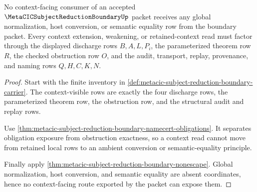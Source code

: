\begin{theorem}
\label{thm:metacic-subject-reduction-boundary-context-nonescape}
No context-facing consumer of an accepted $\MetaCICSubjectReductionBoundaryUp$ packet receives any global normalization, host conversion, or semantic equality row from the boundary packet. Every context extension, weakening, or retained-context read must factor through the displayed discharge rows $B,A,L,P_i$, the parameterized theorem row $R$, the checked obstruction row $O$, and the audit, transport, replay, provenance, and naming rows $Q,H,C,K,N$.
\end{theorem}
\begin{proof}
Start with the finite inventory in \autoref{def:metacic-subject-reduction-boundary-carrier}. The context-visible rows are exactly the four discharge rows, the parameterized theorem row, the obstruction row, and the structural audit and replay rows.

Use \autoref{thm:metacic-subject-reduction-boundary-namecert-obligations}. It separates obligation exposure from obstruction exactness, so a context read cannot move from retained local rows to an ambient conversion or semantic-equality principle.

Finally apply \autoref{thm:metacic-subject-reduction-boundary-nonescape}. Global normalization, host conversion, and semantic equality are absent coordinates, hence no context-facing route exported by the packet can expose them.
\end{proof}


